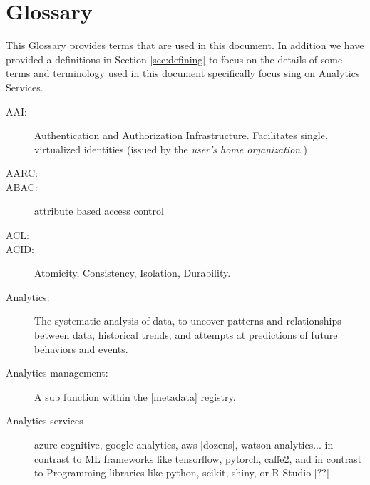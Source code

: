 
\section{Glossary}
\label{sec:glossary}


This Glossary provides terms that are used in this document. In
addition we have provided a definitions in Section \ref{sec:defining}
to focus on the details of some terms and terminology used in this
document specifically focus sing on Analytics Services.

\begin{description}

  
\item[AAI:] Authentication and Authorization
  Infrastructure. Facilitates single, virtualized identities (issued
  by the {\em user’s home organization.})

\item[AARC:]     

\item[ABAC:] attribute based access control

\item[ACL:] 

\item[ACID:] Atomicity, Consistency, Isolation, Durability.

\item[Analytics:] The systematic analysis of data, to uncover patterns
  and relationships between data, historical trends, and attempts at
  predictions of future behaviors and events.

\item[Analytics management:] A sub function within the [metadata]
  registry.

\item[Analytics services] azure cognitive, google analytics, aws
  [dozens], watson analytics... in contrast to ML frameworks like
  tensorflow, pytorch, caffe2, and in contrast to Programming
  libraries like python, scikit, shiny, or R Studio [??]



\end{description}
